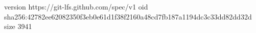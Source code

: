 version https://git-lfs.github.com/spec/v1
oid sha256:42782ee62082350f3eb0e61d1f38f2160a48cd7fb187a1194dc3c33dd82dd32d
size 3941
